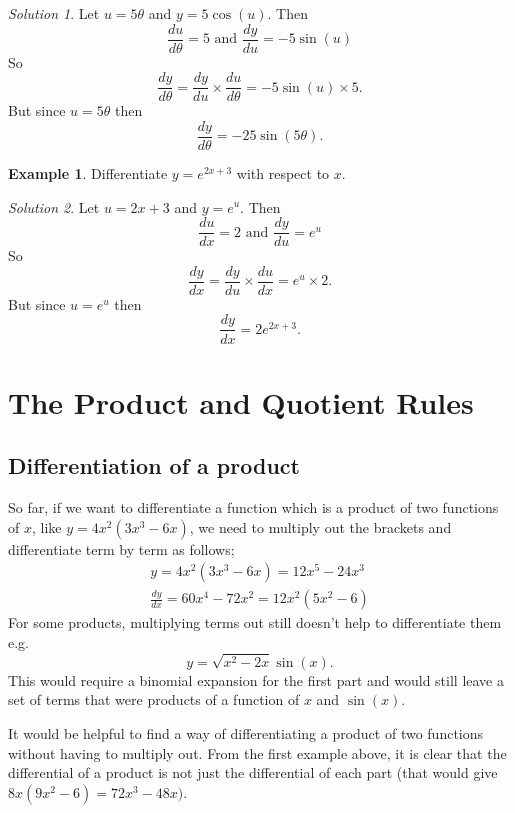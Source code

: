 \documentclass[
  11pt,
  oneside]{book}
\newcommand{\slide}{}
\theoremstyle{definition}
\theoremstyle{definition}
\newtheorem{example}{Example}[chapter]
\theoremstyle{definition}
\theoremstyle{definition}
\theoremstyle{remark}
\newtheorem*{solution}{Solution}
\begin{document}
\begin{solution}
Let \(u = 5\theta\) and \(y = 5\cos(u)\). Then
\[
\frac{du}{d\theta} = 5\text{ and }\frac{dy}{du} = -5\sin(u)
\]
So
\[
\frac{dy}{d\theta} = \frac{dy}{du}\times\frac{du}{d\theta} = -5\sin(u)\times5.
\]
But since \(u = 5\theta\) then
\[
\frac{dy}{d\theta} = -25\sin(5\theta).
\]
\end{solution}

\slide

\begin{example}
Differentiate \(y=e^{2x+3}\) with respect to \(x\).
\end{example}

\begin{solution}
Let \(u = 2x+3\) and \(y = e^u\). Then
\[
\frac{du}{dx} = 2\text{ and }\frac{dy}{du} = e^u
\]
So
\[
\frac{dy}{dx} = \frac{dy}{du}\times\frac{du}{dx} = e^u\times2.
\]
But since \(u = e^u\) then
\[
\frac{dy}{dx} = 2e^{2x+3}.
\]
\end{solution}

\slide

\section{The Product and Quotient Rules}\label{lecture-six}

\subsection{Differentiation of a product}\label{differentiation-of-a-product}

So far, if we want to differentiate a function which is a product of two functions of \(x\), like \(y = 4x^2(3x^3 - 6x)\), we need to multiply out the brackets and differentiate term by term as follows;
\begin{gather*}
y = 4x^2(3x^3 - 6x) = 12x^5 - 24x^3\\
\frac{dy}{dx} = 60x^4 - 72x^2 = 12x^2(5x^2 - 6)
\end{gather*}
For some products, multiplying terms out still doesn't help to differentiate them e.g.
\[
y = \sqrt{x^2 - 2x} \sin(x).
\]
This would require a binomial expansion for the first part and would still leave a set of terms that were products of a function of \(x\) and \(\sin(x)\).
\slide

It would be helpful to find a way of differentiating a product of two functions without having to multiply out. From the first example above, it is clear that the differential of a product is not just the differential of each part (that would give \(8x(9x^2 - 6) = 72x^3 - 48x)\).
\end{document}
